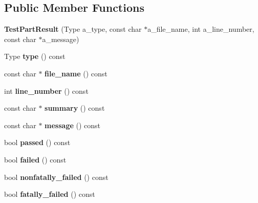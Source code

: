 \subsection*{Public Member Functions}
\begin{DoxyCompactItemize}
\item 
\mbox{\label{classtesting_1_1_test_part_result_a6409eb519c1cd514aab2426c8f40737f}} 
{\bfseries Test\+Part\+Result} (Type a\+\_\+type, const char $\ast$a\+\_\+file\+\_\+name, int a\+\_\+line\+\_\+number, const char $\ast$a\+\_\+message)
\item 
\mbox{\label{classtesting_1_1_test_part_result_aab92b225e8a472e78bd3889ca6df0d2a}} 
Type {\bfseries type} () const
\item 
\mbox{\label{classtesting_1_1_test_part_result_a0be40512f50a0086c4d3dc43938978aa}} 
const char $\ast$ {\bfseries file\+\_\+name} () const
\item 
\mbox{\label{classtesting_1_1_test_part_result_ad4c5da5f13245ac18cf256d0d9f3eda9}} 
int {\bfseries line\+\_\+number} () const
\item 
\mbox{\label{classtesting_1_1_test_part_result_a655ab538e510434ba557ad66c35aa42c}} 
const char $\ast$ {\bfseries summary} () const
\item 
\mbox{\label{classtesting_1_1_test_part_result_a5019dc9d753aba5949777270de255d49}} 
const char $\ast$ {\bfseries message} () const
\item 
\mbox{\label{classtesting_1_1_test_part_result_ac90edd5ea9cc4bb986a1eb2b5e1d53de}} 
bool {\bfseries passed} () const
\item 
\mbox{\label{classtesting_1_1_test_part_result_aa04b377c3e7ed57d39e882df5561ac90}} 
bool {\bfseries failed} () const
\item 
\mbox{\label{classtesting_1_1_test_part_result_a6197c7f6672acc1cfdf580eb1f2183ac}} 
bool {\bfseries nonfatally\+\_\+failed} () const
\item 
\mbox{\label{classtesting_1_1_test_part_result_a77db157eff9531c3c00c2420502f9a89}} 
bool {\bfseries fatally\+\_\+failed} () const
\end{DoxyCompactItemize}

